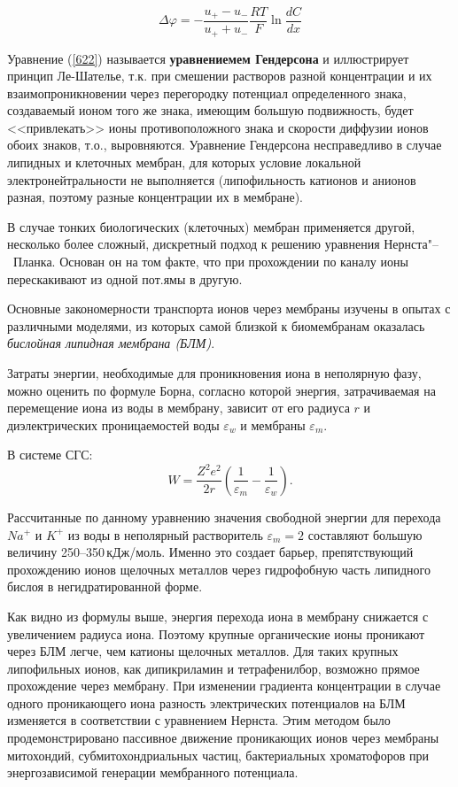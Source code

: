 \documentclass[12pt,a4paper,oneside]{book}
\begin{document}
\begin{equation}
	\label{622}
	\Delta \varphi = -\frac{u_+-u_-}{u_++u_-} \frac{RT}{F} \ln \frac{dC}{dx}
\end{equation}

Уравнение (\ref{622}) называется {\bf уравнениемем Гендерсона} и иллюстрирует принцип Ле-Шателье, т.к. при смешении растворов разной концентрации и их взаимопроникновении через перегородку потенциал определенного знака, создаваемый ионом того же знака, имеющим большую подвижность, будет <<привлекать>> ионы противоположного знака и скорости диффузии ионов обоих знаков, т.о., выровняются. Уравнение Гендерсона несправедливо в случае липидных и клеточных мембран, для которых условие локальной электронейтральности не выполняется (липофильность катионов и анионов разная, поэтому разные концентрации их в мембране). 

В случае тонких биологических (клеточных) мембран применяется другой, несколько более сложный, дискретный подход к решению уравнения Нернста"--~Планка. Основан он на том факте, что при прохождении по каналу ионы перескакивают из одной пот.ямы в другую.

\par{}

Основные закономерности транспорта ионов через мембраны изучены в опытах с различными моделями, из которых самой близкой к биомембранам оказалась {\it бислойная липидная мембрана (БЛМ)}. 

Затраты энергии, необходимые для проникновения иона в неполярную фазу, можно оценить по формуле Борна, согласно которой энергия, затрачиваемая на перемещение иона из воды в мембрану, зависит от его радиуса $r$ и диэлектрических проницаемостей воды $\varepsilon_w$ и мембраны $\varepsilon_m$. 

В системе СГС: 
\begin{equation}
	W = \frac{Z^2e^2}{2r} \left( \frac{1}{\varepsilon_m} -
		\frac{1}{\varepsilon_{w}} \right).
\end{equation}

Рассчитанные по данному уравнению значения свободной энергии для перехода $Na^+$ и $K^+$ из воды в неполярный растворитель $\varepsilon_m = 2$ составляют большую величину 250--350\,кДж/моль. Именно это создает барьер, препятствующий прохождению ионов щелочных металлов через гидрофобную часть липидного бислоя в негидратированной форме. 

Как видно из формулы выше, энергия перехода иона в мембрану снижается с увеличением радиуса иона. Поэтому крупные органические ионы проникают через БЛМ легче, чем катионы щелочных металлов. Для таких крупных липофильных ионов, как дипикриламин и тетрафенилбор, возможно прямое прохождение через мембрану. При изменении градиента концентрации в случае одного проникающего иона разность электрических потенциалов на БЛМ изменяется в соответствии с уравнением Нернста. Этим методом было продемонстрировано пассивное движение проникающих ионов через мембраны митохондий, субмитохондриальных частиц, бактериальных хроматофоров при энергозависимой генерации мембранного потенциала. 
\end{document}
